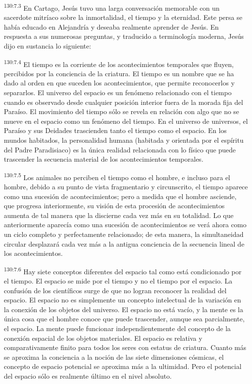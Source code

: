 \par
\textsuperscript{130:7.3} En Cartago, Jesús tuvo una larga conversación memorable con un sacerdote mitríaco sobre la inmortalidad, el tiempo y la eternidad. Este persa se había educado en Alejandría y deseaba realmente aprender de Jesús. En respuesta a sus numerosas preguntas, y traducido a terminología moderna, Jesús dijo en sustancia lo siguiente:

\par
\textsuperscript{130:7.4} El tiempo es la corriente de los acontecimientos temporales que fluyen, percibidos por la conciencia de la criatura. El tiempo es un nombre que se ha dado al orden en que suceden los acontecimientos, que permite reconocerlos y separarlos. El universo del espacio es un fenómeno relacionado con el tiempo cuando es observado desde cualquier posición interior fuera de la morada fija del Paraíso. El movimiento del tiempo sólo se revela en relación con algo que no se mueve en el espacio como un fenómeno del tiempo. En el universo de universos, el Paraíso y sus Deidades trascienden tanto el tiempo como el espacio. En los mundos habitados, la personalidad humana (habitada y orientada por el espíritu del Padre Paradisiaco) es la única realidad relacionada con lo físico que puede trascender la secuencia material de los acontecimientos temporales.

\par
\textsuperscript{130:7.5} Los animales no perciben el tiempo como el hombre, e incluso para el hombre, debido a su punto de vista fragmentario y circunscrito, el tiempo aparece como una sucesión de acontecimientos; pero a medida que el hombre asciende, que progresa interiormente, su visión de esta procesión de acontecimientos aumenta de tal manera que la discierne cada vez más en su totalidad. Lo que anteriormente aparecía como una sucesión de acontecimientos se verá ahora como un ciclo completo y perfectamente relacionado; de esta manera, la simultaneidad circular desplazará cada vez más a la antigua conciencia de la secuencia lineal de los acontecimientos.

\par
\textsuperscript{130:7.6} Hay siete conceptos diferentes del espacio tal como está condicionado por el tiempo. El espacio se mide por el tiempo y no el tiempo por el espacio. La confusión de los científicos surge de que no logran reconocer la realidad del espacio. El espacio no es simplemente un concepto intelectual de la variación en la conexión de los objetos del universo. El espacio no está vacío, y la mente es la única cosa que el hombre conoce que puede trascender, aunque sea parcialmente, el espacio. La mente puede funcionar independientemente del concepto de la conexión espacial de los objetos materiales. El espacio es relativa y comparativamente finito para todos los seres con estatus de criatura. Cuanto más se aproxima la conciencia a la noción de las siete dimensiones cósmicas, el concepto de espacio potencial se aproxima más a la ultimidad. Pero el potencial del espacio sólo es realmente último en el nivel absoluto.

